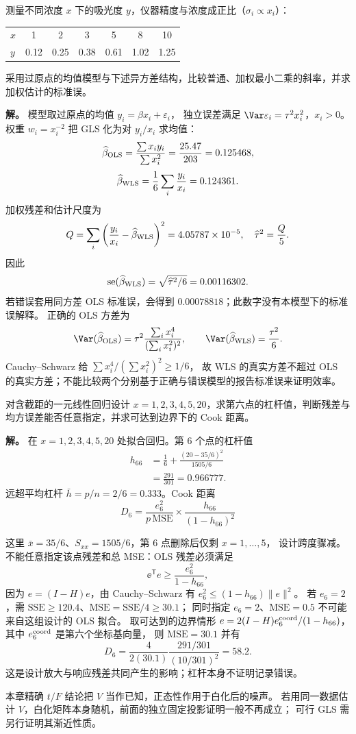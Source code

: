 \begin{exbox}
测量不同浓度 $x$ 下的吸光度 $y$，仪器精度与浓度成正比（$\sigma_i\propto x_i$）：

\begin{center}
\begin{tabular}{lcccccc}
\hline
$x$ & 1 & 2 & 3 & 5 & 8 & 10 \\
$y$ & 0.12 & 0.25 & 0.38 & 0.61 & 1.02 & 1.25 \\
\hline
\end{tabular}
\end{center}
采用过原点的均值模型与下述异方差结构，比较普通、加权最小二乘的斜率，并求加权估计的标准误。

\textbf{解。} 模型取过原点的均值 $y_i=\beta x_i+\varepsilon_i$，
独立误差满足 $\Var\varepsilon_i=\tau^2x_i^2$，$x_i>0$。
权重 $w_i=x_i^{-2}$ 把 GLS 化为对 $y_i/x_i$ 求均值：
\[
 \widehat\beta_{\rm OLS}=\frac{\sum x_iy_i}{\sum x_i^2}
 =\frac{25.47}{203}=0.125468,
\]
\[
 \widehat\beta_{\rm WLS}=\frac16\sum_i\frac{y_i}{x_i}=0.124361.
\]
加权残差和估计尺度为
\[
 Q=\sum_i\left(\frac{y_i}{x_i}-\widehat\beta_{\rm WLS}\right)^2
 =4.05787\times10^{-5},\quad
 \widehat\tau^2=\frac Q5.
\]
因此
\[
 \operatorname{se}(\widehat\beta_{\rm WLS})
 =\sqrt{\widehat\tau^2/6}=0.00116302.
\]
若错误套用同方差 OLS 标准误，会得到 $0.00078818$；此数字没有本模型下的标准误解释。
正确的 OLS 方差为
\[
 \Var(\widehat\beta_{\rm OLS})
 =\tau^2\frac{\sum_i x_i^4}{(\sum_i x_i^2)^2},\qquad
 \Var(\widehat\beta_{\rm WLS})=\frac{\tau^2}{6}.
\]
Cauchy--Schwarz 给 $\sum x_i^4/(\sum x_i^2)^2\ge1/6$，
故 WLS 的真实方差不超过 OLS 的真实方差；不能比较两个分别基于正确与错误模型的报告标准误来证明效率。
\end{exbox}
\begin{exbox}[高杠杆点的识别]
对含截距的一元线性回归设计 $x=1,2,3,4,5,20$，求第六点的杠杆值，判断残差与均方误差能否任意指定，并求可达到边界下的 Cook 距离。

\textbf{解。} 在 $x=1,2,3,4,5,20$ 处拟合回归。第 6 个点的杠杆值
\[
\begin{aligned}
 h_{66}&=\frac16+\frac{(20-35/6)^2}{1505/6}\\
 &=\frac{291}{301}=0.966777.
\end{aligned}
\]
远超平均杠杆 $\bar h=p/n=2/6=0.333$。Cook 距离
\[
D_6=\frac{e_6^2}{p\,\mathrm{MSE}}\times\frac{h_{66}}{(1-h_{66})^2}
\]

这里 $\bar x=35/6$、$S_{xx}=1505/6$，第 6 点删除后仅剩 $x=1,\ldots,5$，
设计跨度骤减。不能任意指定该点残差和总 MSE：OLS 残差必须满足
\[
 \ee^{\mathsf T}e\ge\frac{e_6^2}{1-h_{66}},
\]
因为 $e=(I-H)e$，由 Cauchy--Schwarz 有 $e_6^2\le(1-h_{66})\|e\|^2$。
若 $e_6=2$，需 $\mathrm{SSE}\ge120.4$、$\mathrm{MSE}=\mathrm{SSE}/4\ge30.1$；
同时指定 $e_6=2$、$\mathrm{MSE}=0.5$ 不可能来自这组设计的 OLS 拟合。
取可达到的边界情形 $e=2(I-H)e_6^{\rm coord}/(1-h_{66})$，其中 $e_6^{\rm coord}$ 是第六个坐标基向量，
则 $\mathrm{MSE}=30.1$ 并有
\[
 D_6=\frac{4}{2(30.1)}\frac{291/301}{(10/301)^2}=58.2.
\]
这是设计放大与响应残差共同产生的影响；杠杆本身不证明记录错误。
\end{exbox}

\begin{note}[已知与估计的协方差形状]
本章精确 $t/F$ 结论把 $V$ 当作已知，正态性作用于白化后的噪声。
若用同一数据估计 $V$，白化矩阵本身随机，前面的独立固定投影证明一般不再成立；
可行 GLS 需另行证明其渐近性质。
\end{note}




